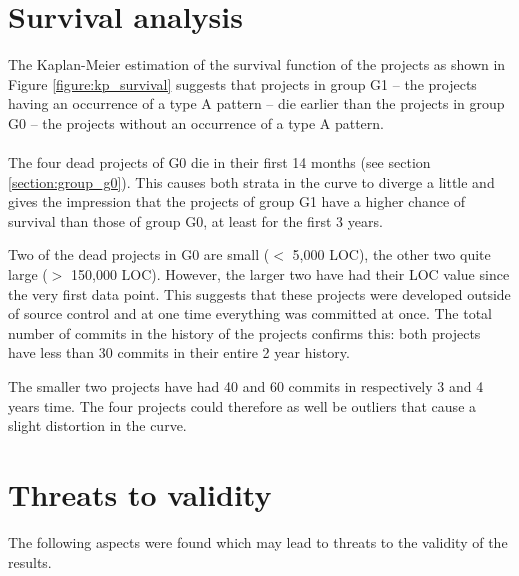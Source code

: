 \section{Survival analysis}
\label{section:kp_survival}
The Kaplan-Meier estimation of the survival function of the projects as shown
in Figure \ref{figure:kp_survival} suggests that projects in group G1 -- the
projects having an occurrence of a type A pattern -- die earlier than the
projects in group G0 -- the projects without an occurrence of a type A pattern.

\paragraph{}
The four dead projects of G0 die in their first 14 months (see section
\ref{section:group_g0}). This causes both strata in the curve to diverge a
little and gives the impression that the projects of group G1 have a higher
chance of survival than those of group G0, at least for the first 3 years.

Two of the dead projects in G0 are small ($<$ 5,000 LOC), the other two
quite large ($>$ 150,000 LOC). However, the larger two have had their LOC value
since the very first data point. This suggests that these projects were
developed outside of source control and at one time everything was committed at
once. The total number of commits in the history of the projects confirms this:
both projects have less than 30 commits in their entire 2 year history.

The smaller two projects have had 40 and 60 commits in respectively 3 and 4
years time. The four projects could therefore as well be outliers that cause a
slight distortion in the curve.


\section{Threats to validity}
The following aspects were found which may lead to threats to the validity of
the results.

